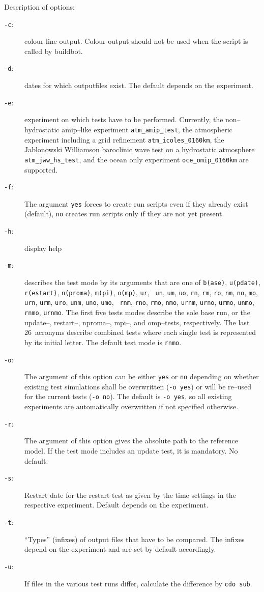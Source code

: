 Description of options:
\begin{description}
\item[{\tt -c}:] colour line output. Colour output should not be used
  when the script is called
  by buildbot.
\item[{\tt -d}:] dates for which outputfiles exist. The default
  depends on the experiment.
\item[{\tt -e}:] experiment on which tests have to be
  performed. Currently, the non--hydrostatic amip--like experiment
    {\tt atm\_amip\_test}, the atmospheric experiment including a
    grid refinement {\tt atm\_icoles\_0160km}, the Jablonowski
    Williamson baroclinic wave test on a hydrostatic atmosphere {\tt
      atm\_jww\_hs\_test}, and the ocean only
    experiment {\tt oce\_omip\_0160km} are supported.
\item[{\tt -f}:] The argument {\tt yes} forces to create run scripts
  even if they 
  already exist (default), {\tt no} creates run scripts only if they are not yet
  present.
\item[{\tt -h}:] display help
\item[{\tt -m}:] \begin{sloppypar} 
  describes the test mode by its arguments that are one
  of {\tt b(ase)}, {\tt u(pdate)}, 
  {\tt r(estart)}, {\tt n(proma)}, {\tt m(pi)}, {\tt o(mp)}, {\tt ur}, {\tt
    un}, {\tt um}, {\tt uo}, {\tt rn}, {\tt rm}, {\tt ro},  {\tt nm},
  {\tt no}, {\tt mo}, {\tt
    urn}, {\tt urm}, {\tt uro}, {\tt unm}, {\tt uno}, {\tt umo}, {\tt
    rnm}, {\tt rno}, {\tt rmo}, {\tt nmo}, {\tt urnm}, {\tt urno},
  {\tt urmo}, {\tt unmo}, {\tt rnmo}, {\tt urnmo}. The first five
  tests modes describe the sole base run, or the update--, 
  restart--, nproma--, mpi--, and omp--tests, respectively. The last
  26~acronyms 
  describe combined tests 
  where each single test is represented by its initial letter.
  The default test mode is {\tt rnmo}.
  \end{sloppypar}
\item[{\tt -o}:] The argument of this option can be either {\tt yes}
  or {\tt no} depending on whether existing test simulations shall be
  overwritten ({\tt -o yes}) or will be re--used for the current tests ({\tt -o
    no}). The default is {\tt -o yes}, so all existing experiments are
  automatically overwritten if not specified otherwise. 
\item[{\tt -r}:] The argument of this option gives the absolute path
  to the reference model. If the test mode includes an update test, it
  is mandatory. No default.
\item[{\tt -s}:] Restart date for the restart test as given by the
  time settings in the respective experiment. Default depends on the
  experiment.
\item[{\tt -t}:] ``Types'' (infixes) of output files that have to be
  compared. The infixes depend on the experiment and are set by
  default accordingly.
\item[{\tt -u}:] If files in the various test runs differ, calculate
  the difference by {\tt cdo sub}.
\end{description}


